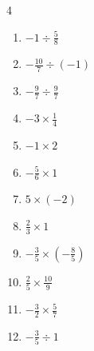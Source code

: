 \begin{multicols}{4}
\begin{enumerate}

  \item $\displaystyle -1\div{}\frac{5}{8}$


  \item $\displaystyle -\frac{10}{7}\div{}\left(-1\right)$


  \item $\displaystyle -\frac{9}{7}\div{}\frac{9}{7}$

        \phantom{$\displaystyle =-1$}

  \item $\displaystyle -3\times{}\frac{1}{4}$


  \item $\displaystyle -1\times{}2$

        \phantom{$\displaystyle =-2$}

\columnbreak %

  \item $\displaystyle -\frac{5}{6}\times{}1$


  \item $\displaystyle 5\times{}\left(-2\right)$

        \phantom{$\displaystyle =-10$}

  \item $\displaystyle \frac{2}{3}\times{}1$


  \item $\displaystyle -\frac{3}{5}\times{}\left(-\frac{8}{5}\right)$


  \item $\displaystyle \frac{2}{5}\times{}\frac{10}{9}$


  \item $\displaystyle -\frac{3}{2}\times{}\frac{5}{7}$


  \item $\displaystyle -\frac{3}{5}\div{}1$


\end{enumerate}
\end{multicols}
